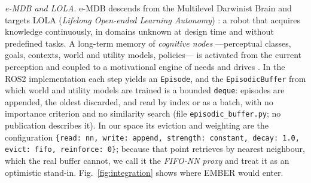\documentclass[conference]{IEEEtran}
\begin{document}
\emph{e-MDB and LOLA.} e-MDB descends from the Multilevel Darwinist Brain
\cite{bellas2010} and targets LOLA (\emph{Lifelong Open-ended Learning
Autonomy}) \cite{romero2023sensors}: a robot that acquires knowledge
continuously, in domains unknown at design time and without predefined tasks.
A long-term memory of \emph{cognitive nodes} ---perceptual classes, goals,
contexts, world and utility models, policies--- is activated from the current
perception \cite{duro2019} and coupled to a motivational engine of needs and
drives \cite{becerra2021,romero2022thesis,romero2023ica}. In the ROS2
implementation \cite{emdbnodes} each step yields an \texttt{Episode}, and the
\texttt{EpisodicBuffer} from which world and utility models are trained is a
bounded \texttt{deque}: episodes are appended, the oldest discarded, and read
by index or as a batch, with no importance criterion and no similarity search
(file \texttt{episodic\_buffer.py}; no publication describes it). In our space
its eviction and weighting are the configuration
\texttt{\{read: nn, write: append, strength: constant, decay: 1.0, evict: fifo,
reinforce: 0\}}; because that point retrieves by nearest neighbour, which the
real buffer cannot, we call it the \emph{FIFO-NN proxy} and treat it as an
optimistic stand-in. Fig.~\ref{fig:integration} shows where EMBER would enter.
\end{document}
